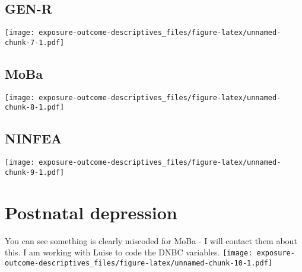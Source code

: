 \documentclass[]{article}
\begin{document}
\hypertarget{gen-r}{%
\subsection{GEN-R}\label{gen-r}}

\texttt{[image: exposure-outcome-descriptives\_files/figure-latex/unnamed-chunk-7-1.pdf]}

\hypertarget{moba}{%
\subsection{MoBa}\label{moba}}

\texttt{[image: exposure-outcome-descriptives\_files/figure-latex/unnamed-chunk-8-1.pdf]}

\hypertarget{ninfea}{%
\subsection{NINFEA}\label{ninfea}}

\texttt{[image: exposure-outcome-descriptives\_files/figure-latex/unnamed-chunk-9-1.pdf]}

\hypertarget{postnatal-depression}{%
\section{Postnatal depression}\label{postnatal-depression}}

You can see something is clearly miscoded for MoBa - I will contact them about this.
I am working with Luise to code the DNBC variables.
\texttt{[image: exposure-outcome-descriptives\_files/figure-latex/unnamed-chunk-10-1.pdf]}
\end{document}
